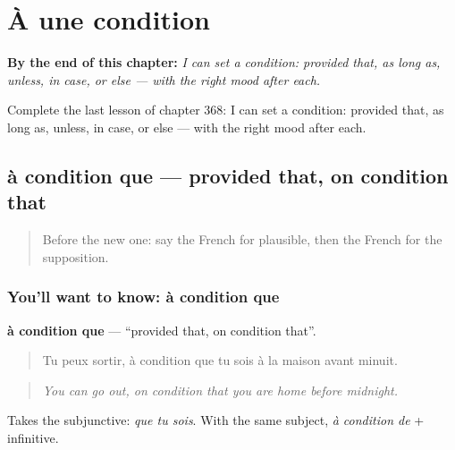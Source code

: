 
\chapter{À une condition}
\label{ch:fr-a-une-condition}

\begin{chapteropening}
\textbf{By the end of this chapter:} \emph{I can set a condition: provided that, as long as, unless, in case, or else — with the right mood after each.}

Complete the last lesson of chapter 368: I can set a condition: provided that, as long as, unless, in case, or else — with the right mood after each.
\end{chapteropening}

\section[à condition que]{à condition que — provided that, on condition that}

\label{lesson:FR-C368-a-condition-que}



\begin{quote}
Before the new one: say the French for plausible, then the French for the supposition.
\end{quote}

\subsection*{You'll want to know: à condition que}
\textbf{à condition que} — \textquotedblleft{}provided that, on condition that\textquotedblright{}.

\begin{quote}
Tu peux sortir, à condition que tu sois à la maison avant minuit.
\end{quote}

\begin{quote}
\emph{You can go out, on condition that you are home before midnight.}
\end{quote}

Takes the subjunctive: \emph{que tu sois}. With the same subject, \emph{à condition de} + infinitive.

